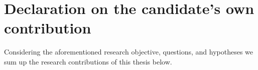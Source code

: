 \section{Declaration on the candidate’s own contribution}
\label{sec:contributions}
Considering the aforementioned research objective, questions, and hypotheses we sum up the research contributions of this thesis below.


